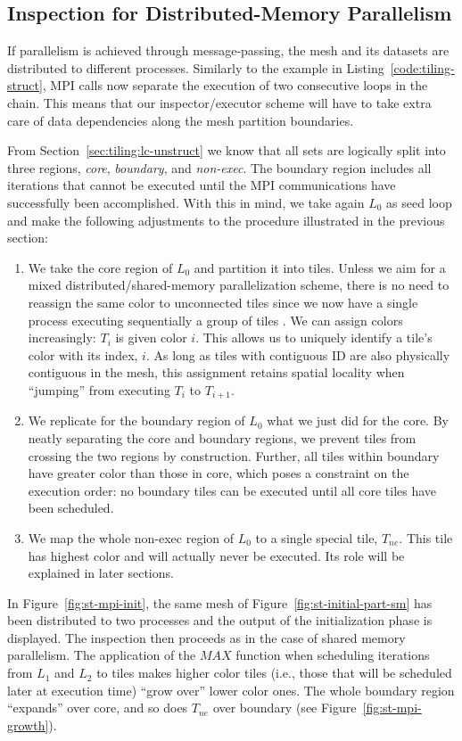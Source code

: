 \subsection*{Inspection for Distributed-Memory Parallelism}
\label{sec:tiling:ex-dist}
If parallelism is achieved through message-passing, the mesh and its datasets are distributed to different processes. Similarly to the example in Listing~\ref{code:tiling-struct}, MPI calls now separate the execution of two consecutive loops in the chain. This means that our inspector/executor scheme will have to take extra care of data dependencies along the mesh partition boundaries.

From Section~\ref{sec:tiling:lc-unstruct} we know that all sets are logically split into three regions, \textit{core}, \textit{boundary}, and \textit{non-exec}. The boundary region includes all iterations that cannot be executed until the MPI communications have successfully been accomplished. With this in mind, we take again $L_0$ as seed loop and make the following adjustments to the procedure illustrated in the previous section:
\begin{enumerate}
\item We take the core region of $L_0$ and partition it into tiles. Unless we aim for a mixed distributed/shared-memory parallelization scheme, there is no need to reassign the same color to unconnected tiles since we now have a single process executing sequentially a group of tiles . We can assign colors increasingly: $T_i$ is given color $i$. This allows us to uniquely identify a tile's color with its index, $i$. As long as tiles with contiguous ID are also physically contiguous in the mesh, this assignment retains spatial locality when ``jumping'' from executing $T_i$ to $T_{i+1}$.
\item We replicate for the boundary region of $L_0$ what we just did for the core. By neatly separating the core and boundary regions, we prevent tiles from crossing the two regions by construction. Further, all tiles within boundary have greater color than those in core, which poses a constraint on the execution order: no boundary tiles can be executed until all core tiles have been scheduled.
\item We map the whole non-exec region of $L_0$ to a single special tile, $T_{ne}$. This tile has highest color and will actually never be executed. Its role will be explained in later sections.
\end{enumerate}

In Figure~\ref{fig:st-mpi-init}, the same mesh of Figure~\ref{fig:st-initial-part-sm} has been distributed to two processes and the output of the initialization phase is displayed. The inspection then proceeds as in the case of shared memory parallelism. The application of the $MAX$ function when scheduling iterations from $L_1$ and $L_2$ to tiles makes higher color tiles (i.e., those that will be scheduled later at execution time) ``grow over'' lower color ones. The whole boundary region ``expands'' over core, and so does $T_{ne}$ over boundary (see Figure~\ref{fig:st-mpi-growth}). 

